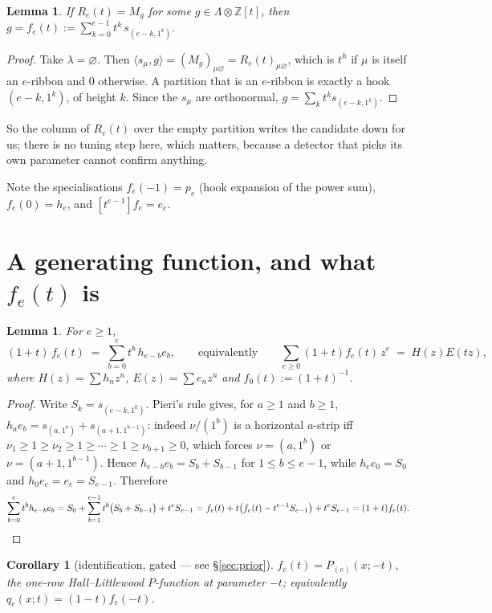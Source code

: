 \documentclass[11pt]{article}
\newtheorem{lemma}[theorem]{Lemma}
\newtheorem{corollary}[theorem]{Corollary}
\theoremstyle{definition}
\newcommand{\Lam}{\Lambda}
\newcommand{\Z}{\mathbb{Z}}
\begin{document}
\begin{lemma}\label{lem:forced}
If $R_e(t)=M_g$ for some $g\in\Lam\otimes\Z[t]$, then
$g=f_e(t):=\sum_{k=0}^{e-1}t^k\,s_{(e-k,1^k)}$.
\end{lemma}

\begin{proof}
Take $\lambda=\varnothing$. Then $\langle s_\mu, g\rangle = (M_g)_{\mu\varnothing}
= R_e(t)_{\mu\varnothing}$, which is $t^{h}$ if $\mu$ is itself an $e$-ribbon and $0$
otherwise. A partition that is an $e$-ribbon is exactly a hook $(e-k,1^k)$, of height $k$.
Since the $s_\mu$ are orthonormal, $g=\sum_k t^ks_{(e-k,1^k)}$.
\end{proof}

So the column of $R_e(t)$ over the empty partition writes the candidate down for us; there is no
tuning step here, which matters, because a detector that picks its own parameter cannot confirm
anything.

Note the specialisations $f_e(-1)=p_e$ (hook expansion of the power sum), $f_e(0)=h_e$, and
$[t^{e-1}]f_e=e_e$.

\section{A generating function, and what $f_e(t)$ is}

\begin{lemma}\label{lem:gf}
For $e\ge1$,
\[
(1+t)\,f_e(t)\;=\;\sum_{b=0}^{e}t^b\,h_{e-b}e_b ,
\qquad\text{equivalently}\qquad
\sum_{e\ge0}(1+t)f_e(t)\,z^e \;=\; H(z)E(tz),
\]
where $H(z)=\sum h_nz^n$, $E(z)=\sum e_nz^n$ and $f_0(t):=(1+t)^{-1}$.
\end{lemma}

\begin{proof}
Write $S_k=s_{(e-k,1^k)}$. Pieri's rule gives, for $a\ge1$ and $b\ge1$,
$h_ae_b=s_{(a,1^b)}+s_{(a+1,1^{b-1})}$: indeed $\nu/(1^b)$ is a horizontal $a$-strip iff
$\nu_1\ge1\ge\nu_2\ge1\ge\cdots\ge1\ge\nu_{b+1}\ge0$, which forces
$\nu=(a,1^b)$ or $\nu=(a+1,1^{b-1})$. Hence $h_{e-b}e_b=S_b+S_{b-1}$ for $1\le b\le e-1$, while
$h_ee_0=S_0$ and $h_0e_e=e_e=S_{e-1}$. Therefore
\[
\sum_{b=0}^{e}t^bh_{e-b}e_b
= S_0+\sum_{b=1}^{e-1}t^b\bigl(S_b+S_{b-1}\bigr)+t^eS_{e-1}
= f_e(t)+t\bigl(f_e(t)-t^{e-1}S_{e-1}\bigr)+t^eS_{e-1}
=(1+t)f_e(t). \qedhere
\]
\end{proof}

\begin{corollary}[identification, gated --- see \S\ref{sec:prior}]\label{cor:HL}
$f_e(t)=P_{(e)}(x;-t)$, the one-row Hall--Littlewood $P$-function at parameter $-t$;
equivalently $q_e(x;t)=(1-t)f_e(-t)$.
\end{corollary}
\end{document}
